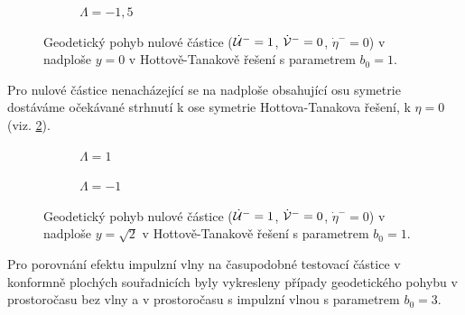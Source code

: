 \begin{figure}[ht]
\begin{subfigure}[b]{0.45\textwidth}
\begin{tikzpicture}
        \end{tikzpicture}
        \caption{$\Lambda = -1,5$}
    \end{subfigure}
    \caption{Geodetický pohyb nulové částice ($\dot \matu^-=1$, $\dot \matv^-=0$, $\dot \eta^-=0$) v nadploše $y = 0$ v Hottově-Tanakově řešení s parametrem $b_0 = 1$.}
    \label{fig:HottaTanakaNullY0}
\end{figure}

Pro nulové částice nenacházející se na nadploše obsahující osu symetrie dostáváme očekávané strhnutí k
ose symetrie Hottova-Tanakova řešení, k $\eta=0$ (viz. \ref{fig:HottaTanakaNullYsqrt2}). 

\begin{figure}[ht]
    \centering
    \begin{subfigure}[b]{0.45\textwidth}
        \caption{$\Lambda = 1$}
    \end{subfigure}
    \hfill
    \begin{subfigure}[b]{0.45\textwidth}
        \caption{$\Lambda = -1$}
    \end{subfigure}
    \caption{Geodetický pohyb nulové částice ($\dot \matu^-=1$, $\dot \matv^-=0$, $\dot \eta^-=0$) v nadploše $y = \sqrt{2}$ v Hottově-Tanakově řešení s parametrem $b_0 = 1$.}
    \label{fig:HottaTanakaNullYsqrt2}
\end{figure}

Pro porovnání efektu impulzní vlny na časupodobné testovací částice v konformně plochých souřadnicích byly vykresleny případy geodetického pohybu v prostoročasu bez vlny
a v prostoročasu s impulzní vlnou s parametrem $b_0=3$.

